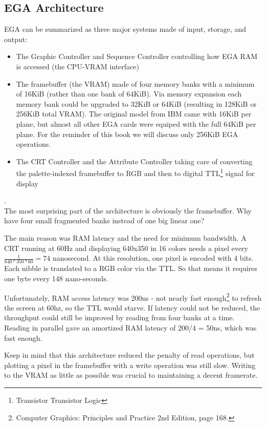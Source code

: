 \documentclass[book.tex]{subfiles}
\begin{document}
\subsection{EGA Architecture}

EGA can be summarized as three major systems made of input, storage, and output:
\begin{itemize}
\item The Graphic Controller and Sequence Controller controlling how EGA RAM is accessed (the CPU-VRAM interface)
\item The framebuffer (the VRAM) made of four memory banks with a minimum of 16KiB (rather than one bank of 64KiB). Via memory expansion each memory bank could be upgraded to 32KiB or 64KiB (resulting in 128KiB or 256KiB total VRAM). The original model from IBM came with 16KiB per plane, but almost all other EGA cards were equiped with the full 64KiB per plane. For the reminder of this book we will discuss only 256KiB EGA operations.
\item The CRT Controller and the Attribute Controller taking care of converting the palette-indexed framebuffer to RGB and then to digital TTL\footnote{Transistor Transistor Logic} signal for display
\end{itemize}

\par
{}.\\

The most surprising part of the architecture is obviously the framebuffer. Why have four small fragmented banks instead of one big linear one?\\
\par
The main reason was RAM latency and the need for minimum bandwidth. A CRT running at 60Hz and displaying 640x350 in 16 colors needs a pixel every $\frac{1}{640*350*60}=74$ nanosecond. At this resolution, one pixel is encoded with 4 bits. Each nibble is translated to a RGB color via the TTL. So that means it requires one byte every 148 nano-seconds.\\
\par
 Unfortunately, RAM access latency was 200ns - not nearly fast enough\footnote{Computer Graphics: Principles and Practice 2nd Edition, page 168.} to refresh the screen at 60hz, so the TTL would starve. If latency could not be reduced, the throughput could still be improved by reading from four banks at a time. Reading in parallel gave an amortized RAM latency of 200/4 = 50ns, which was fast enough.\\
\par
Keep in mind that this architecture reduced the penalty of read operations, but plotting a pixel in the framebuffer with a write operation was still slow. Writing to the VRAM as little as possible was crucial to maintaining a decent framerate. 
\end{document}
